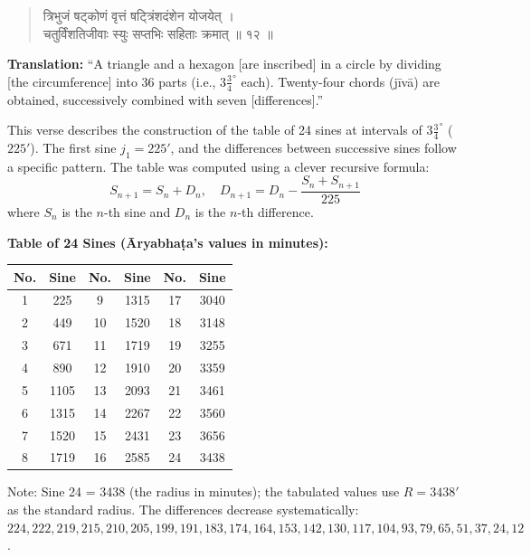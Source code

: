 \documentclass[11pt,a4paper]{article}
\newcommand{\dev}[1]{{\devanagarifont #1}}
\newenvironment{sanskritverse}{\begin{verse}\devanagarifont\large\centering}{\end{verse}}
\begin{document}
\vspace{0.5cm}

\begin{tcolorbox}[colback=gray!10,colframe=titlecolor,title={\dev{\textbf{गणित १२ — चतुर्विंशत्यर्धज्याः (The 24 Sine Table) — FAMOUS VERSE}}}]
\begin{sanskritverse}
\dev{त्रिभुजं षट्कोणं वृत्तं षट्त्रिंशदंशेन योजयेत् ।\\
चतुर्विंशतिजीवाः स्युः सप्तभिः सहिताः क्रमात् ॥ १२ ॥}
\end{sanskritverse}
\end{tcolorbox}

\vspace{0.3cm}
\noindent\textbf{Translation:} ``A triangle and a hexagon [are inscribed] in a circle by dividing [the circumference] into 36 parts (i.e., $3\frac{3}{4}^{\circ}$ each). Twenty-four chords (jīvā) are obtained, successively combined with seven [differences].''

\smallskip
\noindent This verse describes the construction of the table of 24 sines at intervals of $3\frac{3}{4}^{\circ}$ ($225'$). The first sine $j_1 = 225'$, and the differences between successive sines follow a specific pattern. The table was computed using a clever recursive formula:
\[ S_{n+1} = S_n + D_n, \quad D_{n+1} = D_n - \frac{S_n + S_{n+1}}{225} \]
where $S_n$ is the $n$-th sine and $D_n$ is the $n$-th difference.

\vspace{0.3cm}

\begin{center}
\small
\textbf{Table of 24 Sines (Āryabhaṭa's values in minutes):}
\vspace{0.3cm}
\begin{tabular}{|c|c|c|c|c|c|}
\hline
\textbf{No.} & \textbf{Sine} & \textbf{No.} & \textbf{Sine} & \textbf{No.} & \textbf{Sine} \\
\hline
1 & 225 & 9 & 1315 & 17 & 3040 \\
2 & 449 & 10 & 1520 & 18 & 3148 \\
3 & 671 & 11 & 1719 & 19 & 3255 \\
4 & 890 & 12 & 1910 & 20 & 3359 \\
5 & 1105 & 13 & 2093 & 21 & 3461 \\
6 & 1315 & 14 & 2267 & 22 & 3560 \\
7 & 1520 & 15 & 2431 & 23 & 3656 \\
8 & 1719 & 16 & 2585 & 24 & 3438 \\
\hline
\end{tabular}
\end{center}
\noindent\small Note: Sine 24 = 3438 (the radius in minutes); the tabulated values use $R = 3438'$ as the standard radius. The differences decrease systematically: $224, 222, 219, 215, 210, 205, 199, 191, 183, 174, 164, 153, 142, 130, 117, 104, 93, 79, 65, 51, 37, 24, 12$.
\end{document}
